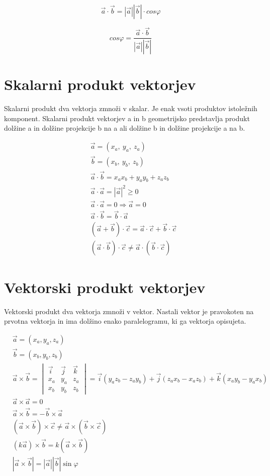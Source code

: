 \documentclass[12pt]{report}
\begin{document}
\[ \vec a \cdot \vec b = |\vec a|| \vec b| \cdot cos\varphi
\]

\[cos \varphi = \frac{\vec a \cdot \vec b}{|\vec a||\vec b|}\]

\section*{Skalarni produkt vektorjev}
Skalarni produkt dva vektorja zmnoži v skalar. Je enak vsoti produktov istoležnih komponent. Skalarni produkt vektorjev a in b geometrijsko predstavlja produkt dolžine a in dolžine projekcije b na a ali dolžine b in dolžine projekcije a na b.

\begin{align*} 
&\vec a = (x_a,\ y_a,\ z_a) \\ 
&\vec b = (x_b,\ y_b,\ z_b) \\ 
& \vec a \cdot \vec b = x_a x_b+ y_ay_b+z_az_b \\
& \vec a \cdot \vec a = |\vec a|^2 \geq 0 \\
&\vec a \cdot \vec a = 0 \Rightarrow \vec a = 0\\
& \vec a \cdot \vec b = \vec b \cdot \vec a \\
& (\vec a + \vec b)\cdot \vec c = \vec a \cdot \vec c+\vec b \cdot \vec c \\
&(\vec a \cdot \vec b)\cdot \vec c \neq \vec a \cdot (\vec b\cdot \vec c)   
\end{align*}


\section*{Vektorski produkt vektorjev}

Vektorski produkt dva vektorja zmnoži v vektor. Nastali vektor je pravokoten na prvotna vektorja in ima dolžino enako paralelogramu, ki ga vektorja opisujeta.


\begin{align*}
&\vec a = (x_a, y_a, z_a) \\
& \vec b = (x_b, y_b, z_b) \\
& \vec a \times \vec b = 
\begin{vmatrix}
\vec i & \vec j & \vec k\\ 
 x_a & y_a & z_a\\ 
 x_b & y_b & z_b
\end{vmatrix} 
= \vec i(y_az_b-z_ay_b) +\vec j (z_ax_b-x_az_b)+ \vec k(x_ay_b-y_ax_b)\\
& \vec a \times \vec a = 0\\
&\vec a \times \vec b=-\vec b \times \vec a\\
&(\vec a \times \vec b)\times\vec c \neq\vec a \times( \vec b \times \vec c)\\
&(k\vec a)\times\vec b=k(\vec a \times \vec b)\\
&|\vec a \times \vec b|=|\vec a||\vec b|\sin\varphi
\end{align*}
\end{document}
